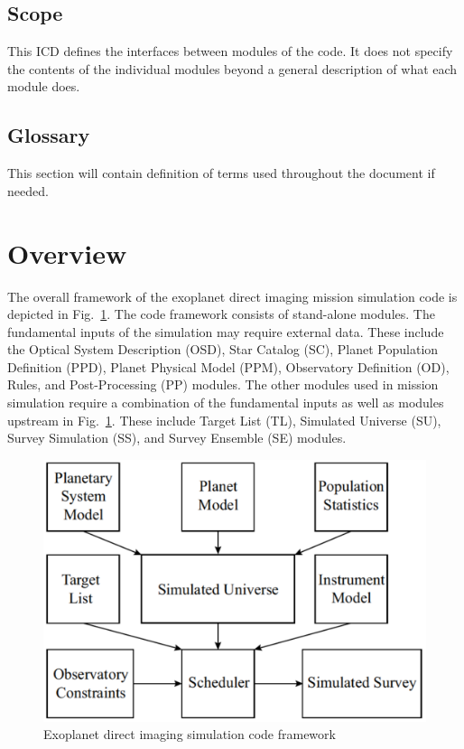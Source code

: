 \documentclass[]{asme2ej}
\begin{document}
\subsection{Scope}
This ICD defines the interfaces between modules of the code. It does not specify the contents of the individual modules beyond a general description of what each module does.

\subsection{Glossary}
This section will contain definition of terms used throughout the document if needed.


\section{Overview}
The overall framework of the exoplanet direct imaging mission simulation code is depicted in Fig.~\ref{figure_framework}. The code framework consists of stand-alone modules. The fundamental inputs of the simulation may require external data. These include the Optical System Description (OSD), Star Catalog (SC), Planet Population Definition (PPD), Planet Physical Model (PPM), Observatory Definition (OD), Rules, and Post-Processing (PP) modules. The other modules used in mission simulation require a combination of the fundamental inputs as well as modules upstream in Fig.~\ref{figure_framework}. These include Target List (TL), Simulated Universe (SU), Survey Simulation (SS), and Survey Ensemble (SE) modules.

\begin{figure}[t]
    \centering
    \includegraphics[width=5in]{Framework}
    \caption{Exoplanet direct imaging simulation code framework}
    \label{figure_framework}
\end{figure}
\end{document}

